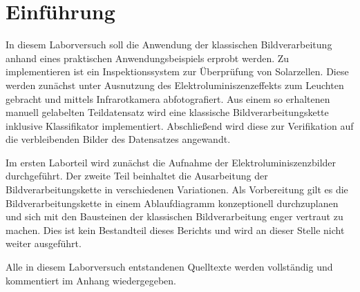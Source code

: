 \chapter{Einführung}

In diesem Laborversuch soll die Anwendung der klassischen Bildverarbeitung anhand eines praktischen Anwendungsbeispiels erprobt werden. Zu implementieren ist ein Inspektionssystem zur Überprüfung von Solarzellen. Diese werden zunächst unter Ausnutzung des Elektroluminiszenzeffekts zum Leuchten gebracht und mittels Infrarotkamera abfotografiert. Aus einem so erhaltenen manuell gelabelten Teildatensatz wird eine klassische Bildverarbeitungskette inklusive Klassifikator implementiert. Abschließend wird diese zur Verifikation auf die verbleibenden Bilder des Datensatzes angewandt.

Im ersten Laborteil wird zunächst die Aufnahme der Elektroluminiszenzbilder durchgeführt. Der zweite Teil beinhaltet die Ausarbeitung der Bildverarbeitungskette in verschiedenen Variationen. Als Vorbereitung gilt es die Bildverarbeitungskette in einem Ablaufdiagramm konzeptionell durchzuplanen und sich mit den Bausteinen der klassischen Bildverarbeitung enger vertraut zu machen. Dies ist kein Bestandteil dieses Berichts und wird an dieser Stelle nicht weiter ausgeführt.

Alle in diesem Laborversuch entstandenen Quelltexte werden vollständig und kommentiert im Anhang wiedergegeben.
